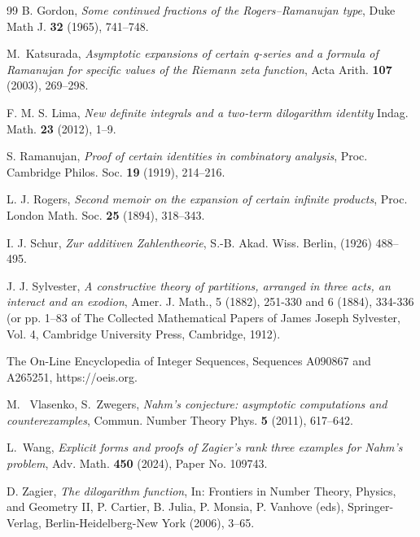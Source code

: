 \documentclass[11pt,reqno]{amsart}
\theoremstyle{remark}
\numberwithin{equation}{section}
\begin{document}
\begin{thebibliography}{99}
B. Gordon, {\it Some continued fractions of the Rogers--Ramanujan type}, Duke Math J. {\bf 32} (1965), 741--748.

M.~Katsurada, {\it Asymptotic expansions of certain q-series and a formula of Ramanujan for specific values of the Riemann zeta function}, Acta Arith. {\bf 107} (2003), 269--298.

F. M. S. Lima, {\it New definite integrals and a two-term dilogarithm identity} Indag. Math. {\bf 23} (2012), 1--9.

S. Ramanujan, {\it Proof of certain identities in combinatory analysis}, Proc. Cambridge Philos. Soc. {\bf 19} (1919), 214--216.

L. J. Rogers, {\it Second memoir on the expansion of certain infinite products}, Proc. London Math. Soc. {\bf 25} (1894), 318--343.

I. J. Schur, {\it Zur additiven Zahlentheorie}, S.-B. Akad. Wiss. Berlin, (1926) 488--495.

J. J. Sylvester, {\it A constructive theory of partitions, arranged in three acts, an interact and an exodion}, Amer. J. Math., 5 (1882), 251-330 and 6 (1884), 334-336 (or pp. 1--83 of The Collected Mathematical Papers of James Joseph Sylvester, Vol. 4, Cambridge University Press, Cambridge,
1912).

The On-Line Encyclopedia of Integer Sequences, Sequences A090867 and A265251, https://oeis.org.


M.~ Vlasenko, S.~Zwegers, {\it Nahm's conjecture: asymptotic computations and counterexamples}, Commun. Number Theory Phys. {\bf 5} (2011), 617--642.

L.~Wang, {\it Explicit forms and proofs of Zagier's rank three examples for Nahm's problem}, Adv. Math. {\bf 450} (2024), Paper No. 109743.

D. Zagier, {\it The dilogarithm function}, In: Frontiers in Number Theory, Physics, and Geometry II, P. Cartier, B. Julia, P. Monsia, P. Vanhove (eds), Springer-Verlag, Berlin-Heidelberg-New York (2006), 3--65.

\end{thebibliography}
\end{document}
